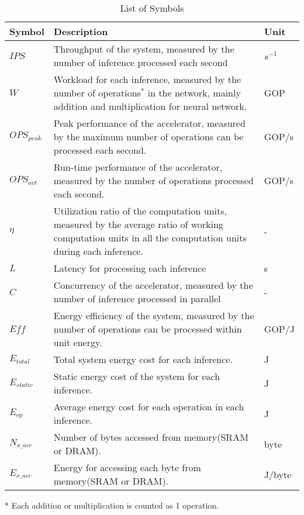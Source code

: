 \begin{table}[htbp]
    \centering
    \begin{threeparttable}
        \caption{List of Symbols}\label{tab:symbol}%
        \begin{tabular}{|l|p{}|l|} \hline
        Symbol & Description & Unit \\ \hline
        $IPS$   & Throughput of the system, measured by the number of inference processed each second & $s^{-1}$ \\ \hline
        $W$     & Workload for each inference, measured by the number of operations$^*$ in the network, mainly addition and multiplication for neural network. & GOP \\ \hline
        $OPS_{peak}$ & Peak performance of the accelerator, measured by the maximum number of operations can be processed each second. & GOP/s \\ \hline
        $OPS_{act}$ & Run-time performance of the accelerator, measured by the number of operations processed each second. & GOP/s \\ \hline
        $\eta$   & Utilization ratio of the computation units, measured by the average ratio of working computation units in all the computation units during each inference. & - \\ \hline
        $L$ & Latency for processing each inference & s \\ \hline
        $C$ & Concurrency of the accelerator, measured by the number of inference processed in parallel & - \\ \hline 
        $Eff$   & Energy efficiency of the system, measured by the number of operations can be processed within unit energy. & GOP/J \\ \hline
        $E_{total}$ & Total system energy cost for each inference. & J \\ \hline 
        $E_{static}$ & Static energy cost of the system for each inference. & J \\ \hline
        $E_{op}$ & Average energy cost for each operation in each inference. & J \\ \hline
        $N_{x\_acc}$ & Number of bytes accessed from memory(SRAM or DRAM). & byte \\ \hline
        $E_{x\_acc}$ & Energy for accessing each byte from memory(SRAM or DRAM). & J/byte \\ \hline
        \end{tabular}%
        \begin{tablenotes}
            \item[*] Each addition or multiplication is counted as 1 operation.
        \end{tablenotes}
    \end{threeparttable}
\end{table}%
